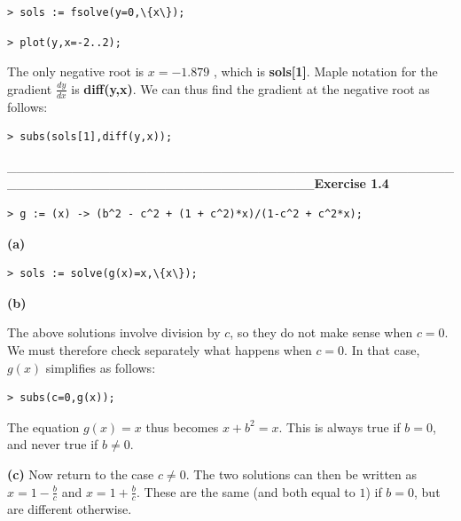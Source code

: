 \documentclass{article}
\begin{document}
\begin{lstlisting}
> sols := fsolve(y=0,\{x\});
\end{lstlisting}
\begin{lstlisting}
> plot(y,x=-2..2);
\end{lstlisting}
\begin{Maple Normal}
The only negative root is 
$ x =- 1.879 $ , which is \textcolor[RGB]{255,0,0}{\textbf{ sols[1]}}.  Maple notation for the gradient 
$ \frac{\mathit{dy}}{\mathit{dx}} $ is \textcolor[RGB]{255,0,0}{\textbf{ diff(y,x)}}.  We can thus find the gradient at the negative root as follows:
\end{Maple Normal}
\begin{lstlisting}
> subs(sols[1],diff(y,x));
\end{lstlisting}
\_\_\_\_\_\_\_\_\_\_\_\_\_\_\_\_\_\_\_\_\_\_\_\_\_\_\_\_\_\_\_\_\_\_\_\_\_\_\_\_\_\_\_\_\_\_\_\_\_\_\_\_\_\_\_\_\_\_\_\_\_\_\_\_\_\_\_\_\_\_\_\_\_\_\_\_\_\_\_\_\_\textbf{Exercise 1.4}\begin{lstlisting}
> g := (x) -> (b^2 - c^2 + (1 + c^2)*x)/(1-c^2 + c^2*x);
\end{lstlisting}
\begin{Maple Normal}
\textbf{(a)}
\end{Maple Normal}
\begin{lstlisting}
> sols := solve(g(x)=x,\{x\});
\end{lstlisting}
\begin{Maple Normal}
\textbf{(b)}
\end{Maple Normal}
The above solutions involve division by 
$ c  $, so they do not make sense when 
$ c =0 $.  We must therefore check separately what happens when 
$ c =0 $.  In that case, 
$ g (x) $ simplifies as follows:\begin{lstlisting}
> subs(c=0,g(x));
\end{lstlisting}
The equation 
$ g (x)=x  $ thus becomes 
$ x +b^{2}=x  $.  This is always true if 
$ b =0 $, and never true if 
$ b \neq 0 $.\

\textbf{(c)} Now return to the case 
$ c \neq 0 $.  The two solutions can then be written as 
$ x =1-\frac{b}{c} $ and 
$ x =1+\frac{b}{c} $.  These are the same (and both equal to 
$ 1 $) if 
$ b =0 $, but are different otherwise.  \

\
\end{document}
